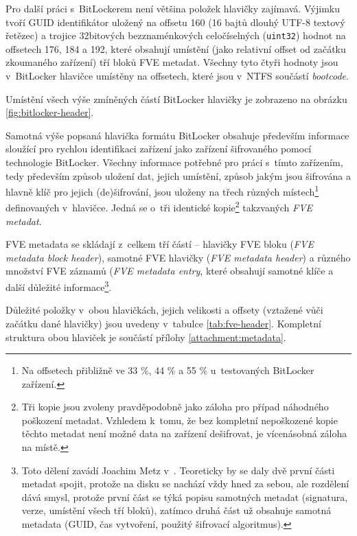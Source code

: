 Pro další práci s~BitLockerem není většina položek hlavičky zajímavá. Výjimku tvoří GUID identifikátor uložený na offsetu 160 (16 bajtů dlouhý UTF-8 textový řetězec) a trojice 32bitových bezznaménkových celočíselných (\texttt{uint32}) hodnot na offsetech 176, 184 a 192, které obsahují umístění (jako relativní offset od začátku zkoumaného zařízení) tří bloků FVE metadat. Všechny tyto čtyři hodnoty jsou v~BitLocker hlavičce umístěny na offsetech, které jsou v~NTFS součástí \emph{bootcode}.

Umístění všech výše zmíněných  částí BitLocker hlavičky je zobrazeno na obrázku \ref{fig:bitlocker-header}.

\label{sec:fve-metadata}

Samotná výše popsaná hlavička formátu BitLocker obsahuje především informace slou\-ží\-cí pro rychlou identifikaci zařízení jako zařízení šifrovaného pomocí technologie BitLocker. Všechny informace potřebné pro práci s~tímto zařízením, tedy především způsob uložení dat, jejich umístění, způsob jakým jsou šifrována a hlavně klíč pro jejich (de)šifrování, jsou uloženy na třech různých místech\footnote{Na offsetech přibližně ve 33 \%, 44 \% a 55 \% u~testovaných BitLocker zařízení.} definovaných v~hlavičce. Jedná se o~tři identické kopie\footnote{Tři kopie jsou zvoleny pravděpodobně jako záloha pro případ náhodného poškození metadat. Vzhledem k~tomu, že bez kompletní nepoškozené kopie těchto metadat není možné data na zařízení dešifrovat, je vícenásobná záloha na místě.} takzvaných \emph{FVE metadat}.

FVE metadata se skládají z~celkem tří částí -- hlavičky FVE bloku (\emph{FVE metadata block header}), samotné FVE hlavičky (\emph{FVE metadata header}) a různého množství FVE záznamů (\emph{FVE metadata entry}, které obsahují samotné klíče a další důležité informace\cite{Metz2011}\footnote{Toto dělení zavádí Joachim Metz v~\cite{Metz2011}. Teoreticky by se daly dvě první části metadat spojit, protože na disku se nachází vždy hned za sebou, ale rozdělení dává smysl, protože první část se týká popisu samotných metadat (signatura, verze, umístění všech tří bloků), zatímco druhá část už obsahuje samotná metadata (GUID, čas vytvoření, použitý šifrovací algoritmus).}.

Důležité položky v~obou hlavičkách, jejich velikosti a offsety (vztažené vůči začátku dané hlavičky) jsou uvedeny v~tabulce \ref{tab:fve-header}. Kompletní struktura obou hlaviček je součástí přílohy \ref{attachment:metadata}.

